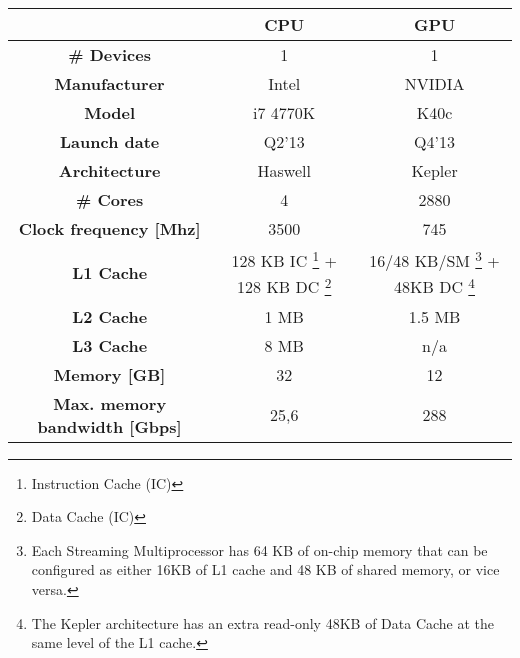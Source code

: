 \begin{minipage}[h]{\hsize}
	\centering
	\begin{tabular}{ccc}
		\toprule[2pt]
												 & \textbf{CPU}      & \textbf{GPU} \\ \midrule
		\textbf{\# Devices}                      & 1                 & 1            \\ 
		\textbf{Manufacturer}                    & Intel             & NVIDIA       \\ 
		\textbf{Model}                           & i7 4770K          & K40c      \\ 
		\textbf{Launch date}                     & Q2'13             & Q4'13      \\ 
		\textbf{Architecture}                    & Haswell      & Kepler        \\ 
		\textbf{\# Cores}                        & 4                 & 2880           \\ 
		\textbf{Clock frequency {[}Mhz{]}}       & 3500              & 745         \\ 
		\textbf{L1 Cache}                        & 128 KB IC \footnote{Instruction Cache (IC)} + 128 KB DC \footnote{Data Cache (IC)} & 16/48 KB/SM \footnote{Each Streaming Multiprocessor has 64 KB of on-chip memory that can be configured as either 16KB of L1 cache and 48 KB of shared memory, or vice versa.} + 48KB DC \footnote{The Kepler architecture has an extra read-only 48KB of Data Cache at the same level of the L1 cache.} \\ 
		\textbf{L2 Cache}                        & 1 MB             & 1.5 MB         \\ 
		\textbf{L3 Cache}                        & 8 MB              & n/a          \\ 
		\textbf{Memory {[}GB{]}}                 & 32                & 12            \\ 
		\textbf{Max. memory bandwidth {[}Gbps{]}} & 25,6              & 288        \\ 
		\bottomrule[2pt]
	\end{tabular}
	\label{tab:bravo}
\end{minipage}